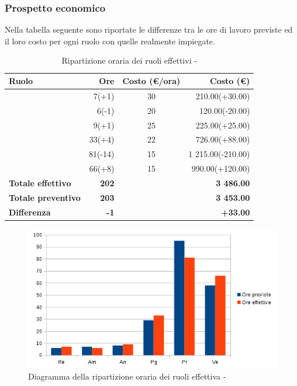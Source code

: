 \documentclass[12pt,a4paper]{article}
\begin{document}
\subsubsection{Prospetto economico}
Nella tabella seguente sono riportate le differenze tra le ore di lavoro previste ed il loro costo per ogni ruolo con quelle realmente impiegate.

\begin{table}[H]
	\begin{center}
		\begin{tabular}{l r c r}
			\toprule
			\textbf{Ruolo}	& \textbf{Ore} & \textbf{Costo (\euro/ora)}	& \textbf{Costo (\euro)} \\ \midrule
			\midrule	
			\RE{} & 7(+1) & 30 & 210.00(+30.00) \\ \midrule
			\AM{} & 6(-1) & 20 & 120.00(-20.00) \\ \midrule
			\AN{} & 9(+1) & 25 & 225.00(+25.00) \\ \midrule
			\PG{} & 33(+4) & 22 & 726.00(+88.00) \\ \midrule
			\PR{} & 81(-14) & 15 & 1 215.00(-210.00) \\ \midrule
			\VR{} & 66(+8) & 15 & 990.00(+120.00) \\ \midrule
			\textbf{Totale effettivo} & \textbf{202} &  & \textbf{3 486.00}\\ \midrule
			\textbf{Totale preventivo} & \textbf{203} &  & \textbf{3 453.00} \\ \midrule
			\textbf{Differenza} & \textbf{-1} &  & \textbf{+33.00} \\ \midrule			
			\bottomrule
		\end{tabular}
		\caption{Ripartizione oraria dei ruoli effettivi - \FC{}}
	\end{center}
\end{table}

\begin{center}
	\begin{figure}[H]
		\centering
		\includegraphics[width=\textwidth]{../img/diagrammaBarreCodificaConsuntivo.png}
		\caption{Diagramma della ripartizione oraria dei ruoli effettiva - \FC{}}
	\end{figure}
\end{center}
\end{document}
